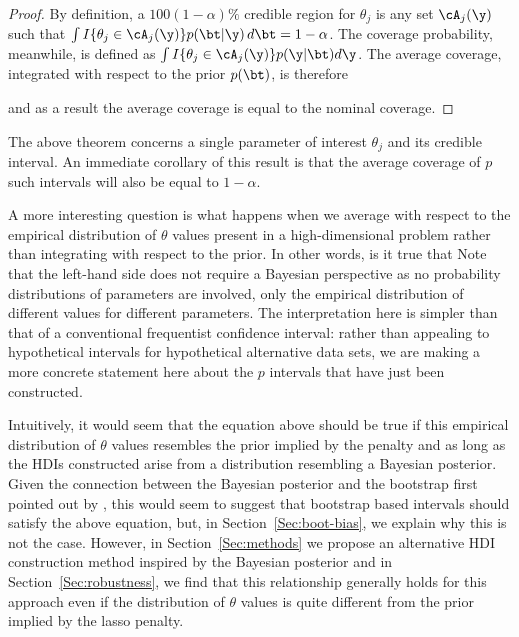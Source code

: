 \begin{proof}
By definition, a $100(1-\alpha)\%$ credible region for $\theta_j$ is any set $\cA_j(\y)$ such that $\int I\{\theta_j \in \cA_j(\y)\} p(\bt|\y)\,d\bt = 1 - \alpha$. The coverage probability, meanwhile, is defined as $\int I\{\theta_j \in \cA_j(\y)\} p(\y | \bt)d\y$. The average coverage, integrated with respect to the prior $p(\bt)$, is therefore


\noindent and as a result the average coverage is equal to the nominal coverage.
\end{proof}

The above theorem concerns a single parameter of interest $\theta_j$ and its credible interval. An immediate corollary of this result is that the average coverage of $p$ such intervals will also be equal to $1-\alpha$.

A more interesting question is what happens when we average with respect to the empirical distribution of $\theta$ values present in a high-dimensional problem rather than integrating with respect to the prior. In other words, is it true that
Note that the left-hand side does not require a Bayesian perspective as no probability distributions of parameters are involved, only the empirical distribution of different values for different parameters. The interpretation here is simpler than that of a conventional frequentist confidence interval: rather than appealing to hypothetical intervals for hypothetical alternative data sets, we are making a more concrete statement here about the $p$ intervals that have just been constructed.

Intuitively, it would seem that the equation above should be true if this empirical distribution of $\theta$ values resembles the prior implied by the penalty and as long as the HDIs constructed arise from a distribution resembling a Bayesian posterior. Given the connection between the Bayesian posterior and the bootstrap first pointed out by \cite{Rubin1981}, this would seem to suggest that bootstrap based intervals should satisfy the above equation, but, in Section~\ref{Sec:boot-bias}, we explain why this is not the case. However, in Section~\ref{Sec:methods} we propose an alternative HDI construction method inspired by the Bayesian posterior and in Section~\ref{Sec:robustness}, we find that this relationship generally holds for this approach even if the distribution of $\theta$ values is quite different from the prior implied by the lasso penalty.

